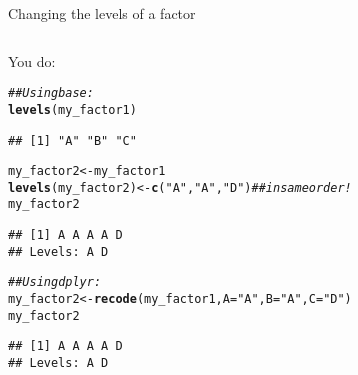 \documentclass[xcolor=dvipsnames, aspectratio=1610, 9pt]{beamer}\usepackage[]{graphicx}\usepackage[]{color}
\makeatletter
\newcommand{\hlstr}[1]{\textcolor[rgb]{0.192,0.494,0.8}{#1}}%
\newcommand{\hlcom}[1]{\textcolor[rgb]{0.678,0.584,0.686}{\textit{#1}}}%
\newcommand{\hlstd}[1]{\textcolor[rgb]{0.345,0.345,0.345}{#1}}%
\newcommand{\hlkwb}[1]{\textcolor[rgb]{0.69,0.353,0.396}{#1}}%
\newcommand{\hlkwc}[1]{\textcolor[rgb]{0.333,0.667,0.333}{#1}}%
\newcommand{\hlkwd}[1]{\textcolor[rgb]{0.737,0.353,0.396}{\textbf{#1}}}%
\newenvironment{kframe}{%
 \def\at@end@of@kframe{}%
 \ifinner\ifhmode%
  \def\at@end@of@kframe{\end{minipage}}%
  \begin{minipage}{\columnwidth}%
 \fi\fi%
 \def\FrameCommand##1{\hskip\@totalleftmargin \hskip-\fboxsep
 \colorbox{shadecolor}{##1}\hskip-\fboxsep
     \hskip-\linewidth \hskip-\@totalleftmargin \hskip\columnwidth}%
 \MakeFramed {\advance\hsize-\width
   \@totalleftmargin\z@ \linewidth\hsize
   \@setminipage}}%
 {\par\unskip\endMakeFramed%
 \at@end@of@kframe}
\newenvironment{knitrout}{}{} %
\makeatother
\begin{document}
\begin{frame}[containsverbatim]{Changing the levels of a factor}
\begin{columns}
\begin{center}
You do:
\begin{knitrout}\scriptsize
{}\color{fgcolor}\begin{kframe}
\begin{alltt}
\hlcom{## Using base:}
\hlkwd{levels}\hlstd{(my_factor1)}
\end{alltt}
\begin{verbatim}
## [1] "A" "B" "C"
\end{verbatim}
\begin{alltt}
\hlstd{my_factor2} \hlkwb{<-} \hlstd{my_factor1}
\hlkwd{levels}\hlstd{(my_factor2)} \hlkwb{<-} \hlkwd{c}\hlstd{(}\hlstr{"A"}\hlstd{,} \hlstr{"A"}\hlstd{,} \hlstr{"D"}\hlstd{)} \hlcom{## in same order!}
\hlstd{my_factor2}
\end{alltt}
\begin{verbatim}
## [1] A A A A D
## Levels: A D
\end{verbatim}
\end{kframe}
\end{knitrout}

\begin{knitrout}\scriptsize
{}\color{fgcolor}\begin{kframe}
\begin{alltt}
\hlcom{## Using dplyr:}
\hlstd{my_factor2} \hlkwb{<-} \hlkwd{recode}\hlstd{(my_factor1,} \hlkwc{A} \hlstd{=} \hlstr{"A"}\hlstd{,} \hlkwc{B} \hlstd{=} \hlstr{"A"}\hlstd{,} \hlkwc{C} \hlstd{=} \hlstr{"D"}\hlstd{)}
\hlstd{my_factor2}
\end{alltt}
\begin{verbatim}
## [1] A A A A D
## Levels: A D
\end{verbatim}
\end{kframe}
\end{knitrout}
\end{center}
\end{columns}

\end{frame}
\end{document}
